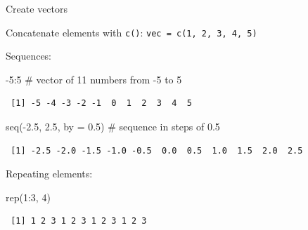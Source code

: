 \documentclass[
  ignorenonframetext,
]{beamer}
\newenvironment{Shaded}{\begin{snugshade}}{\end{snugshade}}
\newcommand{\AttributeTok}[1]{\textcolor[rgb]{0.00,0.34,0.68}{#1}}
\newcommand{\CommentTok}[1]{\textcolor[rgb]{0.54,0.53,0.53}{#1}}
\newcommand{\DecValTok}[1]{\textcolor[rgb]{0.69,0.50,0.00}{#1}}
\newcommand{\FloatTok}[1]{\textcolor[rgb]{0.69,0.50,0.00}{#1}}
\newcommand{\FunctionTok}[1]{\textcolor[rgb]{0.39,0.29,0.61}{#1}}
\newcommand{\NormalTok}[1]{\textcolor[rgb]{0.12,0.11,0.11}{#1}}
\newcommand{\SpecialCharTok}[1]{\textcolor[rgb]{0.24,0.68,0.91}{#1}}
\begin{document}
\begin{frame}[fragile]{Create vectors}
\protect\hypertarget{create-vectors}{}
\small

Concatenate elements with \texttt{c()}:
\texttt{vec\ =\ c(1,\ 2,\ 3,\ 4,\ 5)}

Sequences:

\begin{Shaded}
\begin{Highlighting}[]
\SpecialCharTok{{-}}\DecValTok{5}\SpecialCharTok{:}\DecValTok{5} \CommentTok{\# vector of 11 numbers from {-}5 to 5}
\end{Highlighting}
\end{Shaded}

\begin{verbatim}
 [1] -5 -4 -3 -2 -1  0  1  2  3  4  5
\end{verbatim}

\begin{Shaded}
\begin{Highlighting}[]
\FunctionTok{seq}\NormalTok{(}\SpecialCharTok{{-}}\FloatTok{2.5}\NormalTok{, }\FloatTok{2.5}\NormalTok{, }\AttributeTok{by =} \FloatTok{0.5}\NormalTok{) }\CommentTok{\# sequence in steps of 0.5 }
\end{Highlighting}
\end{Shaded}

\begin{verbatim}
 [1] -2.5 -2.0 -1.5 -1.0 -0.5  0.0  0.5  1.0  1.5  2.0  2.5
\end{verbatim}

Repeating elements:

\begin{Shaded}
\begin{Highlighting}[]
\FunctionTok{rep}\NormalTok{(}\DecValTok{1}\SpecialCharTok{:}\DecValTok{3}\NormalTok{, }\DecValTok{4}\NormalTok{)}
\end{Highlighting}
\end{Shaded}

\begin{verbatim}
 [1] 1 2 3 1 2 3 1 2 3 1 2 3
\end{verbatim}
\end{frame}
\end{document}
